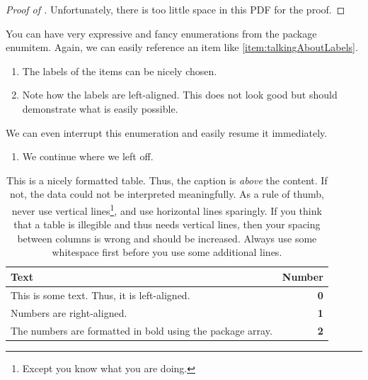 \begin{proof}[Proof of ]
    Unfortunately, there is too little space in this PDF for the proof.
\end{proof}

You can have very expressive and fancy enumerations from the package \textsf{enumitem}. Again, we can easily reference an item like \cref{item:talkingAboutLabels}.
\begin{enumerate}[label = (\roman*), align = left, labelwidth = 2 em, labelsep = 0 em]
    \item The labels of the items can be nicely chosen.\label{item:talkingAboutLabels}
    
    \item Note how the labels are left-aligned. This does not look good but should demonstrate what is easily possible.
\end{enumerate}
We can even interrupt this enumeration and easily resume it immediately.
\begin{enumerate}[resume*]
    \item We continue where we left off.
\end{enumerate}

\begin{table}[t]
    \centering
    \caption{This is a nicely formatted table. Thus, the caption is \emph{above} the content. If not, the data could not be interpreted meaningfully. As a rule of thumb, never use vertical lines\footnote[0][-0.2]{Except you know what you are doing.}, and use horizontal lines sparingly. If you think that a table is illegible and thus needs vertical lines, then your spacing between columns is wrong and should be increased. Always use some whitespace first before you use some additional lines.}
    \label{tab:textAndNumbers}
    \begin{tabular}{p{}>{\bfseries}r}
        \toprule
        Text                                                                & Number\\\midrule
        This is some text. Thus, it is left-aligned.                        & 0\\
        Numbers are right-aligned.                                          & 1\\
        The numbers are formatted in bold using the package \textsf{array}. & 2\\\bottomrule
    \end{tabular}
\end{table}

